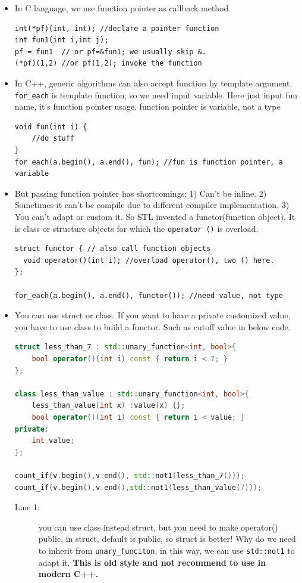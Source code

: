 \documentclass[a4paper,11pt,twoside]{book}
\begin{document}
\begin{itemize}
	
	\item  In C language, we use function pointer as callback method.
\begin{lstlisting}[numbers=none]
int(*pf)(int, int); //declare a pointer function
int fun1(int i,int j);
pf = fun1  // or pf=&fun1; we usually skip &.
(*pf)(1,2) //or pf(1,2); invoke the function 
\end{lstlisting}

	\item In C++, generic algorithms can also accept function by template argument.  \texttt{for\_each} is template function, so we need input variable. Here just input fun name, it's function pointer usage. function pointer is variable, not a type
\begin{lstlisting}[]
void fun(int i) {
	//do stuff
}
for_each(a.begin(), a.end(), fun); //fun is function pointer, a variable
\end{lstlisting}

\item But passing function pointer has shortcomings: 1) Can't be inline.
2) Sometimes it can't be compile due to different compiler implementation.
3) You can't adapt or custom it. So STL invented a functor(function object). It is class or structure objects for which the \texttt{operator ()} is overload.

\begin{lstlisting}
struct functor { // also call function objects
  void operator()(int i); //overload operator(), two () here.
};

for_each(a.begin(), a.end(), functor()); //need value, not type
\end{lstlisting}

	\item  You can use struct or class. If you want to have a private customized value, you have to use class to build a functor.  Such as cutoff value in below code.
\begin{lstlisting}[frame=single, language=c++]
struct less_than_7 : std::unary_function<int, bool>{
    bool operator()(int i) const { return i < 7; }
};

class less_than_value : std::unary_function<int, bool>{
    less_than_value(int x) :value(x) {};
    bool operator()(int i) const { return i < value; }
private:
    int value;
};

count_if(v.begin(),v.end(), std::not1(less_than_7()));
count_if(v.begin(),v.end(),std::not1(less_than_value(7)));
\end{lstlisting}
\begin{description}
	\item[Line 1:] you can use class instead struct, but you need to make operator() public, in struct, default is public, so struct is better! Why do we need to inherit from \texttt{unary\_funciton}, in this way, we can use \texttt{std::not1} to adapt it. \textbf{This is old style and not recommend to use in modern C++.}
\end{description}



\end{itemize}
\end{document}
